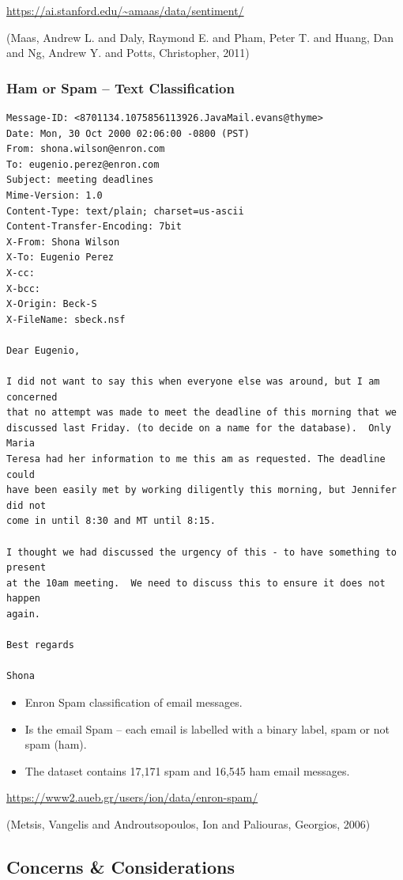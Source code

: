 \documentclass[10pt]{beamer}
\begin{document}
\url{https://ai.stanford.edu/\~amaas/data/sentiment/}

(Maas, Andrew L. and Daly, Raymond E. and Pham, Peter T. and Huang, Dan and Ng, Andrew Y. and Potts, Christopher, 2011)

\subsubsection*{Ham or Spam -- Text Classification}
\label{sec:orgabab5e0}
\begin{verbatim}
Message-ID: <8701134.1075856113926.JavaMail.evans@thyme>
Date: Mon, 30 Oct 2000 02:06:00 -0800 (PST)
From: shona.wilson@enron.com
To: eugenio.perez@enron.com
Subject: meeting deadlines
Mime-Version: 1.0
Content-Type: text/plain; charset=us-ascii
Content-Transfer-Encoding: 7bit
X-From: Shona Wilson
X-To: Eugenio Perez
X-cc: 
X-bcc: 
X-Origin: Beck-S
X-FileName: sbeck.nsf

Dear Eugenio,

I did not want to say this when everyone else was around, but I am concerned 
that no attempt was made to meet the deadline of this morning that we 
discussed last Friday. (to decide on a name for the database).  Only Maria 
Teresa had her information to me this am as requested. The deadline could 
have been easily met by working diligently this morning, but Jennifer did not 
come in until 8:30 and MT until 8:15.

I thought we had discussed the urgency of this - to have something to present 
at the 10am meeting.  We need to discuss this to ensure it does not happen 
again.

Best regards

Shona
\end{verbatim}

\begin{itemize}
\item Enron Spam classification of email messages.
\item Is the email Spam -- each email is labelled with a binary label, spam or not spam
(ham).
\item The dataset contains 17,171 spam and 16,545 ham email messages.
\end{itemize}

\url{https://www2.aueb.gr/users/ion/data/enron-spam/}

(Metsis, Vangelis and Androutsopoulos, Ion and Paliouras, Georgios, 2006)

\subsection*{Concerns \& Considerations}
\label{sec:orgd6f8a5c}
\end{document}
